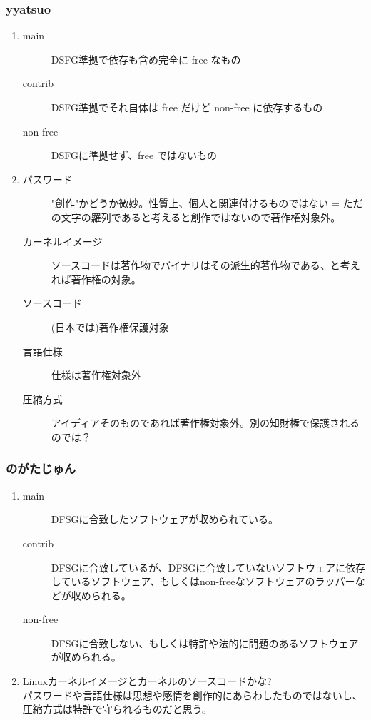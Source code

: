 \documentclass[cjk,dvipdfmx,10pt,%
hyperref={bookmarks=true,bookmarksnumbered=true,bookmarksopen=false,%
colorlinks=false,%
pdftitle={第 58 回 関西 Debian 勉強会},%
pdfauthor={倉敷・のがた・河田・佐々木},%
pdfsubject={資料},%
}]{beamer}
\begin{document}
\begin{frame}
\frametitle{ yyatsuo }
  \begin{enumerate}
  \item
    \begin{description}
    \item [main] DSFG準拠で依存も含め完全に free なもの
    \item [contrib] DSFG準拠でそれ自体は free だけど non-free に依存するもの
    \item [non-free] DSFGに準拠せず、free ではないもの
    \end{description}
  \item
    \begin{description}
    \item [パスワード] "創作"かどうか微妙。性質上、個人と関連付けるものではない = ただの文字の羅列であると考えると創作ではないので著作権対象外。
    \item [カーネルイメージ] ソースコードは著作物でバイナリはその派生的著作物である、と考えれば著作権の対象。
    \item [ソースコード] (日本では)著作権保護対象
    \item [言語仕様] 仕様は著作権対象外
    \item [圧縮方式] アイディアそのものであれば著作権対象外。別の知財権で保護されるのでは？
    \end{description}
  \end{enumerate}
\end{frame}

\begin{frame}
\frametitle{ のがたじゅん }
  \begin{enumerate}
  \item
    \begin{description}
    \item [main] DFSGに合致したソフトウェアが収められている。
    \item [contrib] DFSGに合致しているが、DFSGに合致していないソフトウェアに依存しているソフトウェア、もしくはnon-freeなソフトウェアのラッパーなどが収められる。
    \item [non-free] DFSGに合致しない、もしくは特許や法的に問題のあるソフトウェアが収められる。
  \end{description}
  \item Linuxカーネルイメージとカーネルのソースコードかな?\\
    パスワードや言語仕様は思想や感情を創作的にあらわしたものではないし、圧縮方式は特許で守られるものだと思う。
  \end{enumerate}
\end{frame}
\end{document}
